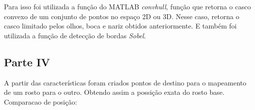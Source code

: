 \documentclass[journal]{IEEEtran}
\begin{document}
Para isso foi utilizada a função do MATLAB \textit{convhull}, função que retorna o casco convexo de um conjunto de pontos no espaço 2D ou 3D. Nesse caso, retorna o casco limitado pelos olhos, boca e nariz obtidos anteriormente. E também foi utilizada a função de detecção de bordas \textit{Sobel}.
\begin{figure}[h]
\centering
{}
\end{figure}

\subsection{Parte IV}

A partir das características foram criados pontos de destino para o mapeamento de um rosto para o outro. Obtendo assim a possição exata do rosto base.
Comparacao de posição:
\end{document}
